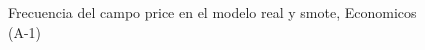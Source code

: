 \begin{figure}[H]
    \centering
    
    \caption{Frecuencia del campo  price en el modelo real y smote, Economicos (A-1)}
    \label{frecuency- Price-smote-enc}
\end{figure}